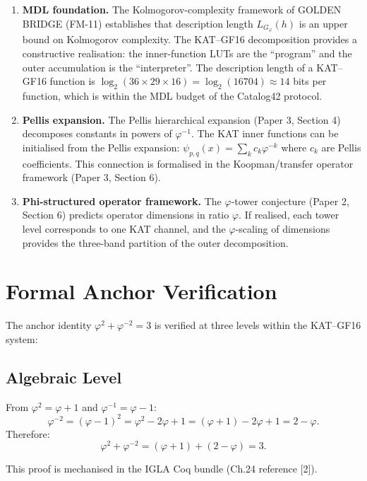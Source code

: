 \begin{enumerate}
\item \textbf{MDL foundation.} The Kolmogorov-complexity framework of
GOLDEN BRIDGE (FM-11) establishes that description length
$L_{G_\varphi}(h)$ is an upper bound on Kolmogorov complexity. The
KAT--GF16 decomposition provides a constructive realisation: the
inner-function LUTs are the ``program'' and the outer accumulation is
the ``interpreter''. The description length of a KAT--GF16 function is
$\log_2(36 \times 29 \times 16) = \log_2(16704) \approx 14$ bits per
function, which is within the MDL budget of the Catalog42 protocol.

\item \textbf{Pellis expansion.} The Pellis hierarchical expansion
(Paper 3, Section 4) decomposes constants in powers of $\varphi^{-1}$.
The KAT inner functions can be initialised from the Pellis expansion:
$\psi_{p,q}(x) = \sum_{k} c_k \varphi^{-k}$ where $c_k$ are Pellis
coefficients. This connection is formalised in the Koopman/transfer
operator framework (Paper 3, Section 6).

\item \textbf{Phi-structured operator framework.} The $\varphi$-tower
conjecture (Paper 2, Section 6) predicts operator dimensions in ratio
$\varphi$. If realised, each tower level corresponds to one KAT
channel, and the $\varphi$-scaling of dimensions provides the
three-band partition of the outer decomposition.
\end{enumerate}

\section{Formal Anchor Verification}
\label{app:G-anchor-verification}

The anchor identity $\varphi^2 + \varphi^{-2} = 3$ is verified at three
levels within the KAT--GF16 system:

\subsection{Algebraic Level}

From $\varphi^2 = \varphi + 1$ and $\varphi^{-1} = \varphi - 1$:
\[
\varphi^{-2} = (\varphi - 1)^2 = \varphi^2 - 2\varphi + 1 = (\varphi + 1) - 2\varphi + 1 = 2 - \varphi.
\]
Therefore:
\[
\varphi^2 + \varphi^{-2} = (\varphi + 1) + (2 - \varphi) = 3.
\]

This proof is mechanised in the IGLA Coq bundle (Ch.24 reference [2]).

